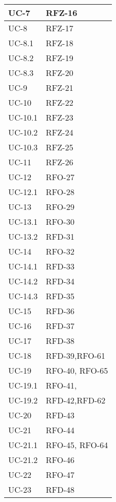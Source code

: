 \begin{xltabular}{\textwidth}{|X| X |}
    \hline
    UC-7 & RFZ-16 \\
    \hline
    UC-8 & RFZ-17\\
    \hline
    UC-8.1 & RFZ-18\\
    \hline
    UC-8.2 & RFZ-19\\
    \hline
    UC-8.3 & RFZ-20\\
    \hline
    UC-9 & RFZ-21\\
    \hline
    UC-10 & RFZ-22\\
    \hline
    UC-10.1 & RFZ-23 \\
    \hline
    UC-10.2 & RFZ-24 \\
    \hline
    UC-10.3 & RFZ-25 \\
    \hline
    UC-11 & RFZ-26 \\
    \hline
    UC-12 & RFO-27\\
    \hline
    UC-12.1 & RFO-28\\
    \hline
    UC-13 & RFO-29\\
    \hline
    UC-13.1 & RFO-30 \\
    \hline
    UC-13.2 & RFD-31\\
    \hline
    UC-14 & RFO-32 \\
    \hline
    UC-14.1 & RFD-33  \\
    \hline
    UC-14.2 & RFD-34\\
    \hline
    UC-14.3 & RFD-35\\
    \hline
    UC-15 & RFD-36 \\
    \hline
    UC-16 & RFD-37\\
    \hline
    UC-17 & RFD-38 \\
    \hline
    UC-18 & RFD-39,\newline RFO-61  \\
    \hline
    UC-19 & RFO-40, \newline RFO-65 \\
    \hline
    UC-19.1 & RFO-41, \\
    \hline
    UC-19.2 & RFD-42,\newline RFD-62 \\
    \hline
    UC-20 & RFD-43 \\
    \hline
    UC-21 & RFO-44 \\
    \hline
    UC-21.1 & RFO-45, \newline RFO-64 \\
    \hline
    UC-21.2 & RFO-46 \\
    \hline
    UC-22 & RFO-47  \\
    \hline
    UC-23 & RFD-48 \\

\end{xltabular}
